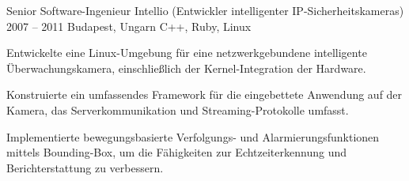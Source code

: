 \cvexperience
  {Senior Software-Ingenieur}
  {Intellio (Entwickler intelligenter IP-Sicherheitskameras)}
  {2007 -- 2011}
  {Budapest, Ungarn}
  {C++, Ruby, Linux}
  {%
    \item Entwickelte eine Linux-Umgebung für eine netzwerkgebundene intelligente Überwachungskamera, einschließlich der Kernel-Integration der Hardware.
    \item Konstruierte ein umfassendes Framework für die eingebettete Anwendung auf der Kamera, das Serverkommunikation und Streaming-Protokolle umfasst.
    \item Implementierte bewegungsbasierte Verfolgungs- und Alarmierungsfunktionen mittels Bounding-Box, um die Fähigkeiten zur Echtzeiterkennung und Berichterstattung zu verbessern.
  }
